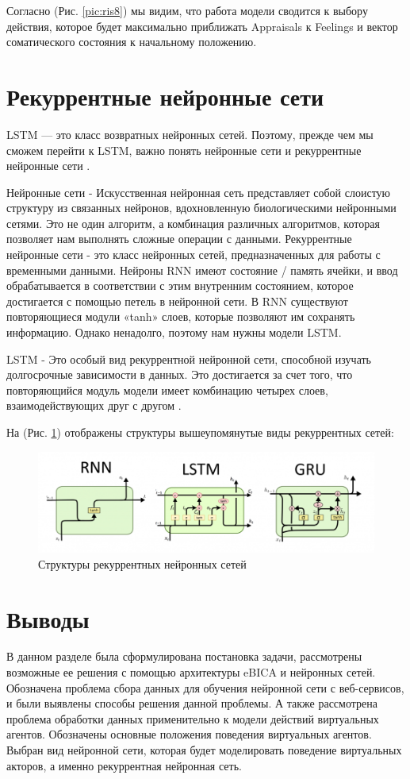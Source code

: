 Согласно (Рис. \ref{pic:ris8}) мы видим, что работа модели сводится к выбору действия, 
которое будет максимально приближать Appraisals к Feelings и вектор соматического состояния к начальному положению.

\section{Рекуррентные нейронные сети}

LSTM — это класс возвратных нейронных сетей. Поэтому, прежде чем мы сможем перейти к LSTM, 
важно понять нейронные сети и рекуррентные нейронные сети \cite{Wikipedia01}. 

Нейронные сети - Искусственная нейронная сеть представляет собой слоистую структуру из связанных нейронов,
вдохновленную биологическими нейронными сетями. Это не один алгоритм, а комбинация различных алгоритмов, 
которая позволяет нам выполнять сложные операции с данными. 
Рекуррентные нейронные сети - это класс нейронных сетей, предназначенных для работы с временными данными. 
Нейроны RNN имеют состояние / память ячейки, и ввод обрабатывается в соответствии 
с этим внутренним состоянием, которое достигается с помощью петель в нейронной сети. 
В RNN существуют повторяющиеся модули «tanh» слоев, которые позволяют им сохранять информацию. 
Однако ненадолго, поэтому нам нужны модели LSTM. 

LSTM - Это особый вид рекуррентной нейронной сети, способной изучать долгосрочные зависимости в данных. 
Это достигается за счет того, что повторяющийся модуль модели имеет комбинацию четырех слоев, взаимодействующих друг с другом \cite{Wikipedia01}. 

На (Рис. \ref{pic:ris9}) отображены структуры вышеупомянутые виды рекуррентных сетей: 

\begin{figure}[h]
\includegraphics[width=0.75\columnwidth]{./img/ris9.png}
\centering
\caption{Структуры рекуррентных нейронных сетей}
\label{pic:ris9}
\end{figure}

\section{Выводы}

В данном разделе была сформулирована постановка задачи, рассмотрены возможные ее решения с помощью архитектуры eBICA и нейронных сетей. 
Обозначена проблема сбора данных для обучения нейронной сети с веб-сервисов, и были выявлены способы решения данной проблемы. 
А также рассмотрена проблема обработки данных применительно к модели действий виртуальных агентов. Обозначены основные положения 
поведения виртуальных агентов. Выбран вид нейронной сети, которая будет моделировать поведение виртуальных акторов, а именно 
рекуррентная нейронная сеть.
